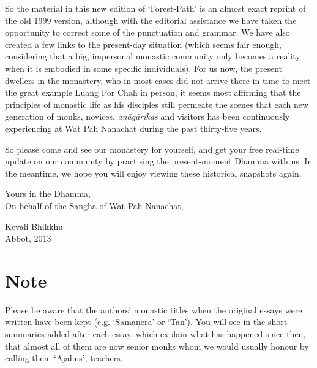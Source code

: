 So the material in this new edition of `Forest-Path' is an almost exact
reprint of the old 1999 version, although with the editorial assistance
we have taken the opportunity to correct some of the punctuation and
grammar. We have also created a few links to the present-day situation
 (which seems fair enough, considering that a big, impersonal monastic
community only becomes a reality when it is embodied in some specific
individuals). For us now, the present dwellers in the monastery, who in
most cases did not arrive there in time to meet the great example Luang
Por Chah in person, it seems most affirming that the principles of
monastic life as his disciples still permeate the scenes that each new
generation of monks, novices, \emph{anāgārikas} and visitors has been
continuously experiencing at Wat Pah Nanachat during the past
thirty-five years.

So please come and see our monastery for yourself, and get your free
real-time update on our community by practising the present-moment
Dhamma with us. In the meantime, we hope you will enjoy viewing these
historical snapshots again.

\bigskip
{\par\raggedleft
Yours in the Dhamma,\\
On behalf of the Sangha of Wat Pah Nanachat,

Kevali Bhikkhu\\
Abbot, 2013
\par}

\vfill

\section{Note}

Please be aware that the authors' monastic titles when the original
essays were written have been kept (e.g. `Sāmaṇera' or `Tan').  You will
see in the short summaries added after each essay, which explain what
has happened since then, that almost all of them are now senior monks
whom we would usually honour by calling them `Ajahns', teachers.

